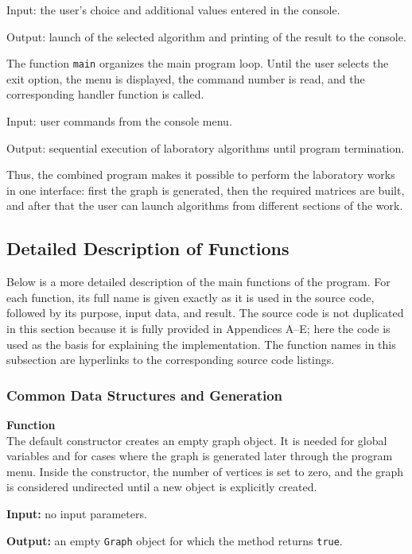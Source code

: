 \documentclass[a4paper,final]{article}
\newcommand{\coderef}[2]{\hyperref[#2]{\texttt{\detokenize{#1}}}}
\begin{document}
Input: the user's choice and additional values entered in the console.

Output: launch of the selected algorithm and printing of the result to the console.

The function \texttt{main} organizes the main program loop. Until the user selects the exit option, the menu is displayed, the command number is read, and the corresponding handler function is called.

Input: user commands from the console menu.

Output: sequential execution of laboratory algorithms until program termination.

Thus, the combined program makes it possible to perform the laboratory works in one interface: first the graph is generated, then the required matrices are built, and after that the user can launch algorithms from different sections of the work.

\subsection{Detailed Description of Functions}

Below is a more detailed description of the main functions of the program. For each function, its full name is given exactly as it is used in the source code, followed by its purpose, input data, and result. The source code is not duplicated in this section because it is fully provided in Appendices A--E; here the code is used as the basis for explaining the implementation. The function names in this subsection are hyperlinks to the corresponding source code listings.

\subsubsection*{Common Data Structures and Generation}

\noindent\textbf{Function} \coderef{Graph::Graph()}{lst:shared-graph-h}\\
The default constructor creates an empty graph object. It is needed for global variables and for cases where the graph is generated later through the program menu. Inside the constructor, the number of vertices is set to zero, and the graph is considered undirected until a new object is explicitly created.

\textbf{Input:} no input parameters.

\textbf{Output:} an empty \texttt{Graph} object for which the method \coderef{isEmpty()}{lst:shared-graph-h} returns \texttt{true}.
\end{document}
